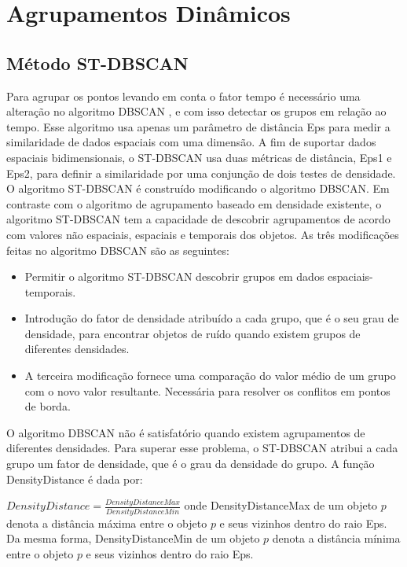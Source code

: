 \section{Agrupamentos Dinâmicos}
\subsection{Método ST-DBSCAN}
\label{stdbscan}

Para agrupar os pontos levando em conta o fator tempo é necessário uma alteração no algoritmo DBSCAN \cite{ESTER1998}, e com isso detectar os grupos em relação ao tempo. Esse algoritmo usa apenas um parâmetro de distância Eps para medir a similaridade de dados espaciais com uma dimensão. A fim de suportar dados espaciais bidimensionais, o ST-DBSCAN \cite{Birant2007STDBSCANAA} usa duas métricas de distância, Eps1 e Eps2, para definir a similaridade por uma conjunção de dois testes de densidade.
O algoritmo ST-DBSCAN é construído modificando o algoritmo DBSCAN. Em contraste com o algoritmo de agrupamento baseado em densidade existente, o algoritmo ST-DBSCAN tem a capacidade de descobrir agrupamentos de acordo com valores não espaciais, espaciais e temporais dos objetos. As três modificações feitas no algoritmo DBSCAN são as seguintes:
\begin{itemize}
\item Permitir o algoritmo ST-DBSCAN descobrir grupos em dados espaciais-temporais.
\item Introdução do fator de densidade atribuído a cada grupo, que é o seu grau de densidade,
para encontrar objetos de ruído quando existem grupos de diferentes densidades.
\item A terceira modificação fornece uma comparação do valor médio de um grupo com o novo valor resultante. Necessária para resolver os conflitos em pontos de borda.
\end{itemize}

O algoritmo DBSCAN não é satisfatório quando existem agrupamentos de diferentes densidades. Para superar esse problema,  o ST-DBSCAN atribui a cada grupo um fator de densidade, que é o grau da densidade do grupo.
A função DensityDistance é dada por:

${DensityDistance = \frac{DensityDistanceMax}{DensityDistanceMin}}$
\linebreak
onde DensityDistanceMax de um objeto ${p}$ denota a distância máxima entre o objeto ${p}$ e seus vizinhos dentro do raio Eps. Da mesma forma, DensityDistanceMin de um objeto ${p}$ denota a distância mínima entre o objeto ${p}$ e seus vizinhos dentro do raio Eps.

